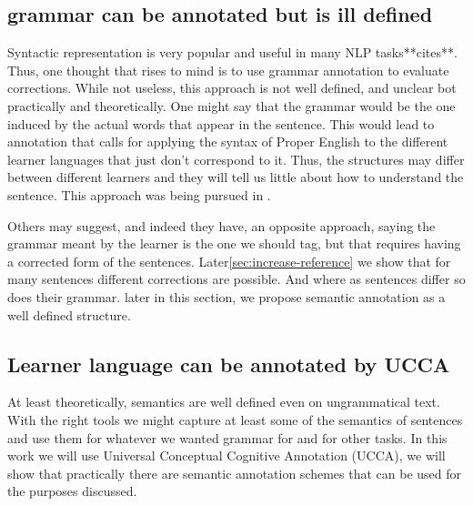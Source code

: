 \documentclass[english]{article}
\begin{document}
{\subsection{grammar can be annotated but is ill defined}

Syntactic representation is very popular and useful in many NLP tasks{*}{*}cites{*}{*}.
Thus, one thought that rises to mind is to use grammar annotation
to evaluate corrections. While not useless, this approach is not well
defined, and unclear bot practically and theoretically. One might
say that the grammar would be the one induced by the actual words
that appear in the sentence. This would lead to annotation that calls
for applying the syntax of Proper English to the different learner
languages that just don't correspond to it. Thus, the structures may
differ between different learners and they will tell us little about
how to understand the sentence. This approach was being pursued in
\cite{berzak2016universal}. 

Others may suggest, and indeed they have\cite{nagataphrase}, an opposite
approach, saying the grammar meant by the learner is the one we should
tag, but that requires having a corrected form of the sentences. Later\ref{sec:increase-reference}
we show that for many sentences different corrections are possible.
And where as sentences differ so does their grammar. later in this
section, we propose semantic annotation as a well defined structure.

\subsection{Learner language can be annotated by UCCA}

At least theoretically, semantics are well defined even on ungrammatical
text. With the right tools we might capture at least some of the semantics
of sentences and use them for whatever we wanted grammar for and for
other tasks. In this work we will use Universal Conceptual Cognitive
Annotation (UCCA)\cite{abend2013universal}, we will show that practically
there are semantic annotation schemes that can be used for the purposes
discussed.

}
\end{document}
